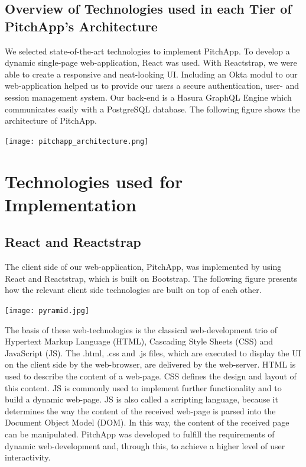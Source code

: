 \break

\section{Overview of Technologies used in each Tier of PitchApp's Architecture}

We selected state-of-the-art technologies to implement PitchApp. To develop a dynamic single-page web-application, React was used. With Reactstrap, we were able to create a responsive and neat-looking UI. Including an Okta modul to our web-application helped us to provide our users a secure authentication, user- and session management system. Our back-end is a Hasura GraphQL Engine which communicates easily with a PostgreSQL database. The following figure shows the architecture of PitchApp.

\begin{center}
	\texttt{[image: pitchapp\_architecture.png]}
\end{center}


\chapter{Technologies used for Implementation}
\section{React and Reactstrap}

The client side of our web-application, PitchApp, was implemented by using React and Reactstrap, which is built on Bootstrap. The following figure presents how the relevant client side technologies are built on top of each other.

\begin{center}
	\texttt{[image: pyramid.jpg]}
\end{center}  

The basis of these web-technologies is the classical web-development trio of Hypertext Markup Language (HTML), Cascading Style Sheets (CSS) and JavaScript (JS). The .html, .css and .js files, which are executed to display the UI on the client side by the web-browser, are delivered by the web-server. HTML is used to describe the content of a web-page. CSS defines the design and layout of this content. JS is commonly used to implement further functionality and to build a dynamic web-page. JS is also called a scripting language, because it determines the way the content of the received web-page is parsed into the Document Object Model (DOM). In this way, the content of the received page can be manipulated. PitchApp was developed to fulfill the requirements of dynamic web-development and, through this, to achieve a higher level of user interactivity.

